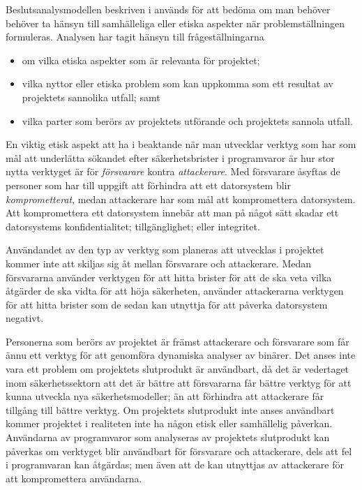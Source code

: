 Beslutsanalysmodellen beskriven i \cite{föreskrifter} används för att bedöma om man behöver behöver ta hänsyn till samhälleliga eller etiska aspekter när problemställningen formuleras.
Analysen har tagit hänsyn till frågeställningarna
\begin{itemize}
    \item om vilka etiska aspekter som är relevanta för projektet;
    \item vilka nyttor eller etiska problem som kan uppkomma som ett resultat av projektets sannolika utfall; samt
    \item vilka parter som berörs av projektets utförande och projektets sannola utfall.
\end{itemize}

En viktig etisk aspekt att ha i beaktande när man utvecklar verktyg som har som mål att underlätta sökandet efter säkerhetsbrister i programvaror är hur stor nytta verktyget är för \emph{försvarare} kontra \emph{attackerare}.
Med försvarare åsyftas de personer som har till uppgift att förhindra att ett datorsystem blir \emph{komprometterat}, medan attackerare har som mål att kompromettera datorsystem.
Att kompromettera ett datorsystem innebär att man på något sätt skadar ett datorsystems konfidentialitet; tillgänglighet; eller integritet.

Användandet av den typ av verktyg som planeras att utvecklas i projektet kommer inte att skiljas sig åt mellan försvarare och attackerare.
Medan försvararna använder verktygen för att hitta brister för att de ska veta vilka åtgärder de ska vidta för att höja säkerheten, använder attackerarna verktygen för att hitta brister som de sedan kan utnyttja för att påverka datorsystem negativt.

Personerna som berörs av projektet är främst attackerare och försvarare som får ännu ett verktyg för att genomföra dynamiska analyser av binärer.
Det anses inte vara ett problem om projektets slutprodukt är användbart, då det är vedertaget inom säkerhetssektorn att det är bättre att försvararna får bättre verktyg för att kunna utveckla nya säkerhetsmodeller; än att förhindra att attackerare får tillgång till bättre verktyg.
Om projektets slutprodukt inte anses användbart kommer projektet i realiteten inte ha någon etisk eller samhällelig påverkan.
Användarna av programvaror som analyseras av projektets slutprodukt kan påverkas om verktyget blir användbart för försvarare och attackerare, dels att fel i programvaran kan åtgärdas; men även att de kan utnyttjas av attackerare för att kompromettera användarna.
